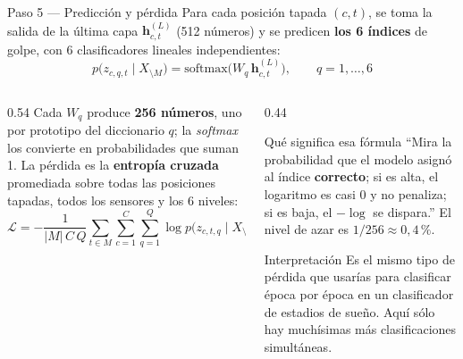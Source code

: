 \documentclass[aspectratio=169,10pt]{beamer}
\newcommand{\term}[1]{\textbf{\color{deepgreen}#1}}
\newcommand{\eng}[1]{{\itshape\color{muted}#1}}
\begin{document}
\begin{frame}[c]{Paso 5 --- Predicción y pérdida}
  \footnotesize
  Para cada posición tapada $(c,t)$, se toma la salida de la última capa $\mathbf{h}^{(L)}_{c,t}$ (512 números) y se predicen \term{los 6 índices} de golpe, con 6 clasificadores lineales independientes:
  \[ p\big(z_{c,q,t}\mid X_{\setminus M}\big) = \mathrm{softmax}\big(W_q\,\mathbf{h}^{(L)}_{c,t}\big), \qquad q = 1,\ldots,6 \]
  \vspace{-2mm}
  \begin{columns}[t,totalwidth=\linewidth]
    \begin{column}{0.54\linewidth}
      Cada $W_q$ produce \term{256 números}, uno por prototipo del diccionario $q$; la \eng{softmax} los convierte en probabilidades que suman 1.
      \vspace{2mm}
      La pérdida es la \term{entropía cruzada} promediada sobre todas las posiciones tapadas, todos los sensores y los 6 niveles:
      \[ \mathcal{L} = -\frac{1}{|M|\,C\,Q}\sum_{t\in M}\sum_{c=1}^{C}\sum_{q=1}^{Q}\log p\big(z_{c,t,q}\mid X_{\setminus M}\big) \]
    \end{column}
    \begin{column}{0.44\linewidth}
      \begin{block}{Qué significa esa fórmula}
        \footnotesize
        ``Mira la probabilidad que el modelo asignó al índice \term{correcto}; si es alta, el logaritmo es casi 0 y no penaliza; si es baja, el $-\log$ se dispara.''
        \vspace{1.5mm}
        El nivel de azar es $1/256 \approx 0{,}4\,\%$.
      \end{block}
      \vspace{1mm}
      \begin{exampleblock}{Interpretación}
        Es el mismo tipo de pérdida que usarías para clasificar época por época en un clasificador de estadios de sueño. Aquí sólo hay muchísimas más clasificaciones simultáneas.
      \end{exampleblock}
    \end{column}
  \end{columns}
\end{frame}
\end{document}
